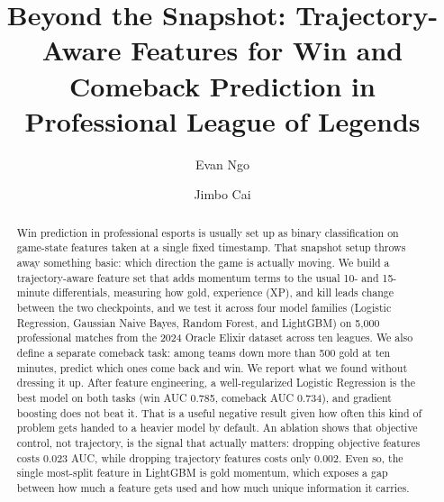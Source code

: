 \documentclass[sigconf,nonacm]{acmart}
\begin{document}
\title{Beyond the Snapshot: Trajectory-Aware Features for Win and
Comeback Prediction in Professional League of Legends}

\author{Evan Ngo}

\author{Jimbo Cai}

\begin{abstract}
Win prediction in professional esports is usually set up as binary classification on game-state
features taken at a single fixed timestamp. That snapshot setup throws away something basic:
which direction the game is actually moving. We build a trajectory-aware feature set that adds
momentum terms to the usual 10- and 15-minute differentials, measuring how gold, experience (XP),
and kill leads change between the two checkpoints, and we test it across four model families
(Logistic Regression, Gaussian Naive Bayes, Random Forest, and LightGBM) on 5{,}000 professional
matches from the 2024 Oracle Elixir dataset across ten leagues. We also define a separate comeback
task: among teams down more than 500 gold at ten minutes, predict which ones come back and win. We
report what we found without dressing it up. After feature engineering, a well-regularized
Logistic Regression is the best model on both tasks (win AUC 0.785, comeback AUC 0.734), and
gradient boosting does not beat it. That is a useful negative result given how often this kind of
problem gets handed to a heavier model by default. An ablation shows that objective control, not
trajectory, is the signal that actually matters: dropping objective features costs 0.023 AUC,
while dropping trajectory features costs only 0.002. Even so, the single most-split feature in
LightGBM is gold momentum, which exposes a gap between how much a feature gets used and how much
unique information it carries.
\end{abstract}


\maketitle
\end{document}
